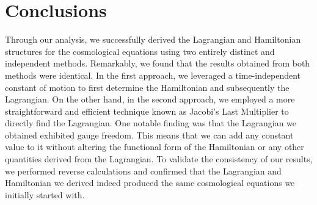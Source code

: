 \documentclass[12pt]{article}
\begin{document}
\section{Conclusions}\label{Con}
Through our analysis, we successfully derived the Lagrangian and Hamiltonian structures for the cosmological equations using two entirely distinct and independent methods. Remarkably, we found that the results obtained from both methods were identical.
In the first approach, we leveraged a time-independent constant of motion to first determine the Hamiltonian and subsequently the Lagrangian. On the other hand, in the second approach, we employed a more straightforward and efficient technique known as Jacobi's Last Multiplier to directly find the Lagrangian. One notable finding was that the Lagrangian we obtained exhibited gauge freedom. This means that we can add any constant value to it without altering the functional form of the Hamiltonian or any other quantities derived from the Lagrangian.
To validate the consistency of our results, we performed reverse calculations and confirmed that the Lagrangian and Hamiltonian we derived indeed produced the same cosmological equations we initially started with.

\newpage


\end{document}
